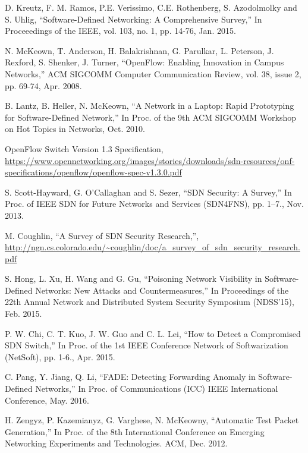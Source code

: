 \begin{thebibliography}{1}

D. Kreutz, F. M. Ramos, P.E. Verissimo, C.E. Rothenberg, S. Azodolmolky and S. Uhlig,
``Software-Defined Networking: A Comprehensive Survey,'' In Proceeedings of the IEEE, vol. 103, no. 1, pp.  14-76, Jan. 2015.

N. McKeown, T. Anderson, H. Balakrishnan, G. Parulkar, L. Peterson, J. Rexford, S. Shenker, J. Turner,
``OpenFlow: Enabling Innovation in Campus Networks,'' ACM SIGCOMM Computer Communication Review, vol. 38, issue 2, pp. 69-74, Apr. 2008.

B. Lantz, B. Heller, N. McKeown,
``A Network in a Laptop: Rapid Prototyping for Software-Defined Network,'' In Proc. of the 9th ACM SIGCOMM Workshop on Hot Topics in Networks, Oct. 2010.

OpenFlow Switch Version 1.3 Specification, \url{https://www.opennetworking.org/images/stories/downloads/sdn-resources/onf-specifications/openflow/openflow-spec-v1.3.0.pdf}

S. Scott-Hayward, G. O’Callaghan and S. Sezer,
``SDN Security: A Survey,'' In Proc. of IEEE SDN for Future Networks and Services (SDN4FNS), pp. 1–7., Nov. 2013.

M. Coughlin,
``A Survey of SDN Security Research,'', \url{http://ngn.cs.colorado.edu/~coughlin/doc/a_survey_of_sdn_security_research.pdf}

S. Hong, L. Xu, H. Wang and G. Gu,
``Poisoning Network Visibility in Software-Defined Networks: New Attacks and Countermeasures,''  In Proceedings of the 22th Annual Network and Distributed System Security Symposium (NDSS’15), Feb. 2015.

P. W. Chi, C. T. Kuo, J. W. Guo and C. L. Lei,
``How to Detect a Compromised SDN Switch,'' In Proc. of the 1st IEEE Conference Network of Softwarization (NetSoft), pp. 1-6., Apr. 2015.

C. Pang, Y. Jiang, Q. Li,
``FADE: Detecting Forwarding Anomaly in Software-Defined Networks,'' In Proc. of Communications (ICC) IEEE International Conference, May. 2016.

H. Zengyz, P. Kazemianyz, G. Varghese, N. McKeowny,
``Automatic Test Packet Generation,'' In Proc. of the 8th International Conference on Emerging Networking Experiments and Technologies. ACM, Dec. 2012.


\end{thebibliography}
